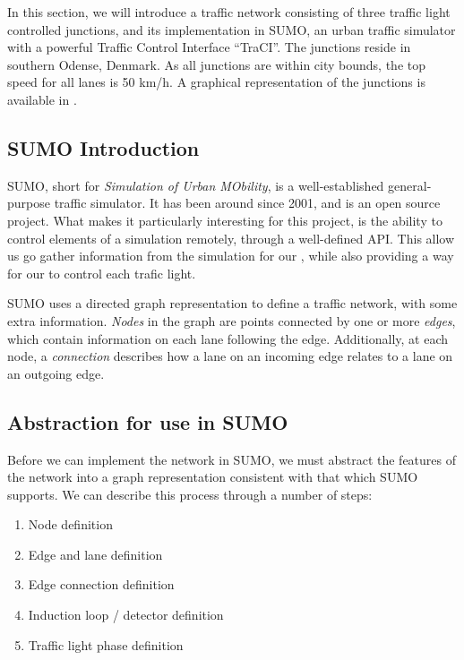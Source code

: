 



In this section, we will introduce a traffic network consisting of three traffic light controlled
junctions, and its implementation in SUMO, an urban traffic simulator with a
powerful Traffic Control Interface ``TraCI''.
The junctions reside in southern Odense, Denmark.
As all junctions are within city bounds, the top speed for all lanes is 50 km/h.
A graphical representation of the junctions is available in .



\subsection{SUMO Introduction}
SUMO, short for \textit{Simulation of Urban MObility}, is a well-established
general-purpose traffic simulator. It has been around since 2001, and is an open
source project. What makes it particularly interesting for this project, is the
ability to control elements of a simulation remotely, through a well-defined
API. This allow us go gather information from the simulation for our
, while also providing a way for our  to control
each trafic light.

SUMO uses a directed graph representation to define a traffic network, with some extra
information. \textit{Nodes}  in the graph are points connected by one or more
\textit{edges}, which contain information on each lane
following the edge. Additionally, at each node, a \textit{connection}
describes how a lane on an incoming edge relates to a lane on an outgoing edge.

\subsection{Abstraction for use in SUMO}
Before we can implement the network in SUMO, we must abstract the features of the network into a graph representation consistent with that which SUMO supports.
We can describe this process through a number of steps:
\begin{enumerate}
\item Node definition
\item Edge and lane definition
\item Edge connection definition
\item Induction loop / detector definition
\item Traffic light phase definition
\end{enumerate}

